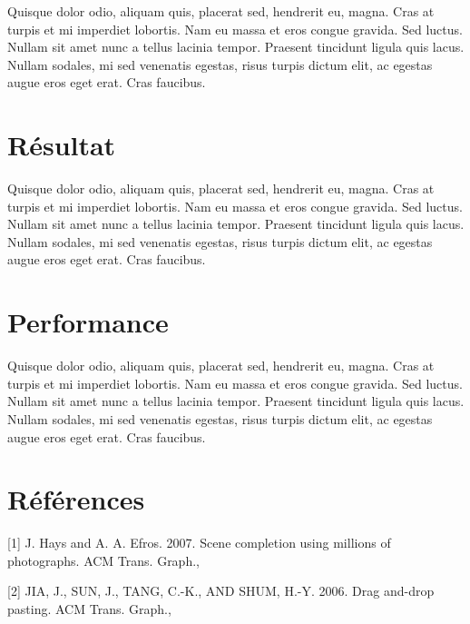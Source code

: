 \documentclass[a4paper]{article}
\begin{document}
Quisque dolor odio, aliquam quis, placerat sed, hendrerit eu, magna. Cras at
turpis et mi imperdiet lobortis. Nam eu massa et eros congue gravida. Sed
luctus. Nullam sit amet nunc a tellus lacinia tempor. Praesent tincidunt ligula
quis lacus. Nullam sodales, mi sed venenatis egestas, risus turpis dictum elit,
ac egestas augue eros eget erat. Cras faucibus.

\section{Résultat}

Quisque dolor odio, aliquam quis, placerat sed, hendrerit eu, magna. Cras at
turpis et mi imperdiet lobortis. Nam eu massa et eros congue gravida. Sed
luctus. Nullam sit amet nunc a tellus lacinia tempor. Praesent tincidunt ligula
quis lacus. Nullam sodales, mi sed venenatis egestas, risus turpis dictum elit,
ac egestas augue eros eget erat. Cras faucibus.

\section{Performance}

Quisque dolor odio, aliquam quis, placerat sed, hendrerit eu, magna. Cras at
turpis et mi imperdiet lobortis. Nam eu massa et eros congue gravida. Sed
luctus. Nullam sit amet nunc a tellus lacinia tempor. Praesent tincidunt ligula
quis lacus. Nullam sodales, mi sed venenatis egestas, risus turpis dictum elit,
ac egestas augue eros eget erat. Cras faucibus.

\section{Références}

[1] J. Hays and A. A. Efros.  2007. Scene completion using millions of photographs. ACM Trans. Graph.,

[2] JIA, J., SUN, J., TANG, C.-K., AND SHUM, H.-Y. 2006. Drag and-drop pasting. ACM Trans. Graph.,
\end{document}
